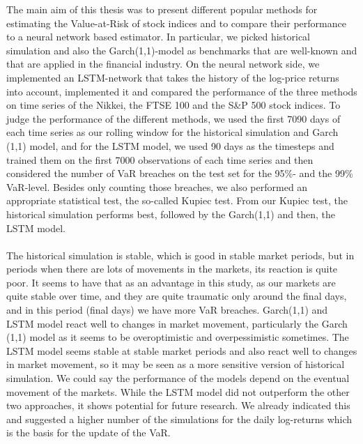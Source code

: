 \documentclass[a4paper,11pt,oneside]{book}
\begin{document}
The main aim of this thesis was to present different popular methods for estimating the Value-at-Risk of stock indices and to compare their performance to a neural network based estimator. In particular, we picked historical simulation and also the Garch(1,1)-model as benchmarks that are well-known and that are applied in the financial industry. On the neural network side, we implemented an LSTM-network that takes the history of the log-price returns into account, implemented it and compared the performance of the three methods on time series of the Nikkei, the  FTSE 100 and the S\&P 500 stock indices. To judge the performance of the different methods, we used the first 7090 days of each time series as our rolling window for the historical simulation and Garch (1,1) model, and for the LSTM model, we used 90 days as the timesteps and trained them on the first 7000 observations of each time series and then considered the number of VaR breaches on the test set for the 95\%- and the 99\% VaR-level. Besides only counting those breaches, we also performed an appropriate statistical test, the so-called Kupiec test. From our Kupiec test, the historical simulation performs best, followed by the Garch(1,1) and then, the LSTM model.\\\\  The historical simulation is stable, which is good in stable market periods, but in periods when there are lots of movements in the markets, its reaction is quite poor. It seems to have that as an advantage in this study, as our markets are quite stable over time, and they are quite traumatic only around the final days, and in this period (final days) we have more VaR breaches.  Garch(1,1) and LSTM model react well to changes in market movement, particularly the Garch (1,1) model as it seems to be overoptimistic and overpessimistic sometimes. The LSTM model seems stable at stable market periods and also react well to changes in market movement, so it may be seen as a more sensitive version of historical simulation. We could say the performance of the models depend on the eventual movement of the markets. While the LSTM model did not outperform the other two approaches, it shows potential for future research. We already indicated this and suggested a higher number of the simulations for the daily log-returns which is the basis for the update of the VaR.



\end{document}
